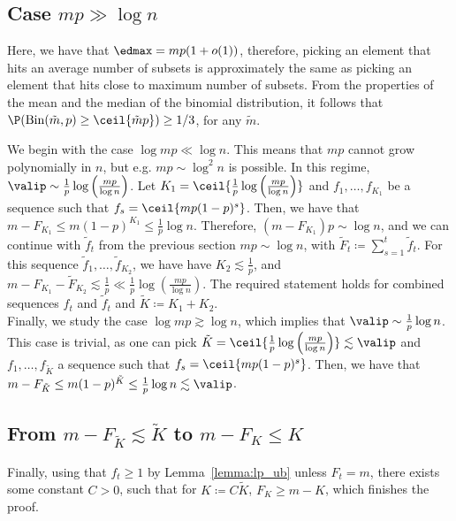 \subsection*{Case \(mp \gg \log n\)}
Here, we have that \(\edmax = mp (1 + o(1))\), therefore, picking an element that hits an average number of subsets is approximately the same as picking an element that hits close to maximum number of subsets. From the properties of the mean and the median of the binomial distribution, it follows that \(\P(\mathrm{Bin}(\tilde m, p) \geq \ceil{\tilde m p}) \geq 1/3\), for any \(\tilde m\). 

We begin with the case \(\log mp \ll \log n\). This means that \(mp\) cannot grow polynomially in \(n\), but e.g. \(mp \sim \log^2 n\) is possible. In this regime, \(\valip \sim \frac{1}{p} \log \left(\frac{mp}{\log n}\right)\). Let \(K_1 = \ceil{\frac{1}{p} \log \left(\frac{mp}{\log n}\right)}\) and \(f_1, \ldots, f_{K_1}\) be a sequence such that \(f_{s} = \ceil{mp(1-p)^s}\). Then, we have that \(m - F_{K_1} \leq m(1 - p)^{K_1} \leq \frac{1}{p}\log n\). Therefore, \((m - F_{K_1})p \sim \log n\), and we can continue with \(\tilde{f}_t\) from the previous section \(mp \sim \log n\), with \(\tilde{F}_t \coloneqq \sum_{s=1}^t \tilde{f}_t\). For this sequence \(\tilde{f}_1, \ldots, \tilde{f}_{K_2}\), we have have \(K_2 \lesssim \frac{1}{p}\), and \(m - F_{K_1} - \tilde{F}_{K_2} \lesssim \frac{1}{p} \ll \frac{1}{p} \log \left(\frac{mp}{\log n}\right)\). The required statement holds for combined sequences \(f_t\) and \(\tilde{f}_t\) and \(\tilde K \coloneqq K_1 + K_2\). \\
\noindent
Finally, we study the case \(\log mp \gtrsim \log n\), which implies that \(\valip \sim \frac{1}{p} \log n\). This case is trivial, as one can pick \(\tilde K = \ceil{\frac{1}{p} \log \left(\frac{mp}{\log n}\right)} \lesssim \valip\) and \(f_1, \ldots, f_{\tilde K}\) a sequence such that \(f_{s} = \ceil{mp(1-p)^s}\). Then, we have that \(m - F_{\tilde K} \leq m(1 - p)^{\tilde K} \leq \frac{1}{p}\log n \lesssim \valip\). 

\subsection*{From \(m - F_{\tilde K} \lesssim \tilde K\) to \(m - F_K \leq K\)}
Finally, using that \(f_t \geq 1\) by Lemma~\ref{lemma:lp_ub} unless \(F_t = m\), there exists some constant \(C > 0\), such that for \(K \coloneqq C\tilde K\), \(F_K \geq m - K\), which finishes the proof.



